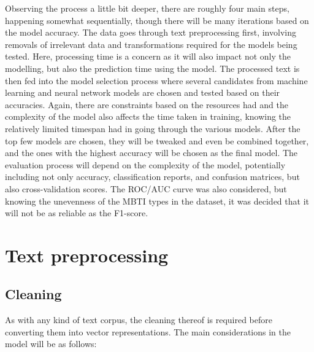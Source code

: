 \documentclass[11pt,a4paper]{article}
\begin{document}
	Observing the process a little bit deeper, there are roughly four main steps, happening somewhat sequentially, though there will be many iterations based on the model accuracy. The data goes through text preprocessing first, involving removals of irrelevant data and transformations required for the models being tested. Here, processing time is a concern as it will also impact not only the modelling, but also the prediction time using the model. The processed text is then fed into the model selection process where several candidates from machine learning and neural network models are chosen and tested based on their accuracies. Again, there are constraints based on the resources had and the complexity of the model also affects the time taken in training, knowing the relatively limited timespan had in going through the various models. After the top few models are chosen, they will be tweaked and even be combined together, and the ones with the highest accuracy will be chosen as the final model. The evaluation process will depend on the complexity of the model, potentially including not only accuracy, classification reports, and confusion matrices, but also cross-validation scores. The ROC/AUC curve was also considered, but knowing the unevenness of the MBTI types in the dataset, it was decided that it will not be as reliable as the F1-score.\autocite{MachineLearningF1}
	
	
	\clearpage
	\section{Text preprocessing}
	
	\subsection{Cleaning}
	
	As with any kind of text corpus, the cleaning thereof is required before converting them into vector representations. The main considerations in the model will be as follows:
	
\end{document}
